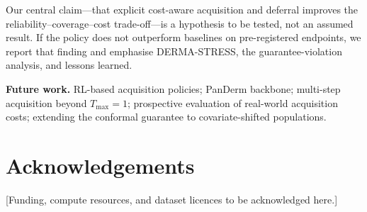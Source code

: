 \documentclass[conference]{IEEEtran}
\newcommand{\1}{\mathbf{1}}
\begin{document}
Our central claim---that explicit cost-aware acquisition and deferral
improves the reliability--coverage--cost trade-off---is a hypothesis to be
tested, not an assumed result. If the policy does not outperform baselines
on pre-registered endpoints, we report that finding and emphasise
DERMA-STRESS, the guarantee-violation analysis, and lessons learned.

\medskip\noindent\textbf{Future work.} RL-based acquisition policies;
PanDerm backbone; multi-step acquisition beyond $T_{\max}=1$;
prospective evaluation of real-world acquisition costs; extending the
conformal guarantee to covariate-shifted populations.

\section*{Acknowledgements}
[Funding, compute resources, and dataset licences to be acknowledged here.]
\end{document}
